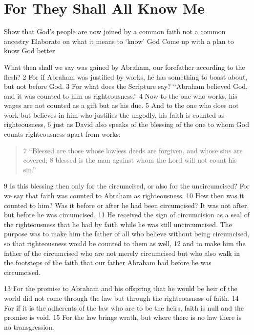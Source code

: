 \chapter{For They Shall All Know Me}

\begin{goals}
\goal Show that God's people are now joined by a common faith not a common ancestry 
\goal Elaborate on what it means to `know' God
\goal Come up with a plan to know God better
\end{goals}

\begin{bible}
What then shall we say was gained by Abraham, our forefather according to the flesh? 2 For if Abraham was justified by works, he has something to boast about, but not before God. 3 For what does the Scripture say? ``Abraham believed God, and it was counted to him as righteousness.'' 4 Now to the one who works, his wages are not counted as a gift but as his due. 5 And to the one who does not work but believes in him who justifies the ungodly, his faith is counted as righteousness, 6 just as David also speaks of the blessing of the one to whom God counts righteousness apart from works:
\begin{quote}
7 ``Blessed are those whose lawless deeds are forgiven, and whose sins are covered;
8 blessed is the man against whom the Lord will not count his sin.''
\end{quote}
9 Is this blessing then only for the circumcised, or also for the uncircumcised? For we say that faith was counted to Abraham as righteousness. 10 How then was it counted to him? Was it before or after he had been circumcised? It was not after, but before he was circumcised. 11 He received the sign of circumcision as a seal of the righteousness that he had by faith while he was still uncircumcised. The purpose was to make him the father of all who believe without being circumcised, so that righteousness would be counted to them as well, 12 and to make him the father of the circumcised who are not merely circumcised but who also walk in the footsteps of the faith that our father Abraham had before he was circumcised.

13 For the promise to Abraham and his offspring that he would be heir of the world did not come through the law but through the righteousness of faith. 14 For if it is the adherents of the law who are to be the heirs, faith is null and the promise is void. 15 For the law brings wrath, but where there is no law there is no transgression.


\end{bible}
